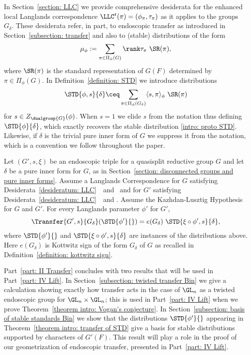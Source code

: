 \documentclass[11pt,letterpaper]{amsart}
\numberwithin{equation}{section}
\begin{document}
In Section~\ref{section: LLC} we provide comprehensive desiderata for the enhanced local Langlands correspondence $\LLC^\mathfrak{e}(\pi) = (\phi_\pi,\tau_\pi)$ as it applies to the groups $G_\delta$. 
{These desiderata refer, in part, to endoscopic transfer as introduced in Section~\ref{subsection: transfer} and also to (stable) distributions of the form
\begin{equation}\label{intro: proto STD}
\mu_{\phi}:=\sum_{\pi\in \Pi_\phi(G)} 
\rank \tau_\pi \  
\SR(\pi) ,
\end{equation}
where $\SR(\pi)$ is the standard representation of $G(F)$ determined by $\pi \in \Pi_\phi(G)$. 
}
In Definition~\ref{definition: STD} we introduce distributions 
\begin{equation}\label{intro: STD}
\STD{\phi,s}{\delta}
\ceq
\sum_{\pi\in \Pi_\phi(G_\delta)} 
\langle
s,\pi
\rangle_\phi \ 
\SR(\pi)
\end{equation}
for $s\in Z_{\dualgroup{G}}(\phi)$.
When $s=1$ we elide $s$ from the notation thus defining $\STD{\phi}{\delta}$, which exactly recovers
the stable distribution \eqref{intro: proto STD}. 
Likewise, if $\delta$ is the trivial pure inner form of $G$ we suppress it from the notation, which is a convention we follow throughout the paper.


\begin{theorem}
\label{theorem intro: transfer of STD}
Let $(G',s,\xi)$ be an endoscopic triple for a quasisplit reductive group $G$ and let $\delta$ be a pure inner form for $G$, as in Section~\ref{section: disconnected groups and pure inner forms}. 
Assume a Langlands Correspondence for $G$ satisfying Desiderata~\ref{desideratum: LLC}\ \LC \ and \ECR\  and for $G'$ satisfying Desiderata~\ref{desideratum: LLC}\ \LC \  and \Sta.
Assume the Kazhdan-Lusztig Hypothesis for $G$ and $G'$.
For every Langlands parameter $\phi'$ for $G'$,
\[
\Transfer{G',s}{G_\delta}
(\STD{\phi'}{})
=
e(G_\delta)\ 
\STD{\xi\circ\phi',s}{\delta},
\]
where $\STD{\phi'}{}$ and $\STD{\xi\circ\phi',s}{\delta}$ are instances of the 
distributions above. 
Here $e(G_\delta)$ is Kottwitz sign of the form $G_\delta$ of $G$ as recalled in Definition~\ref{definition: kottwitz sign}.
\end{theorem}

Part~\ref{part: II Transfer} concludes with two results that will be used in Part~\ref{part: IV Lift}.
In Section~\ref{subsection: twisted transfer Bin} we give a calculation showing exactly how transfer acts in the case of $\GL_n$ as a twisted endoscopic group for $\GL_n\times\GL_n$;
this is used in Part~\ref{part: IV Lift} when we prove Theorem~\ref{theorem intro: Vogan's conjecture}.
In Section~\ref{subsection: basis of stable standards Bin} we show that the distributions $\STD{\phi'}{}$ appearing in Theorem~\ref{theorem intro: transfer of STD} give a basis for stable distributions supported by characters of $G'(F)$.
This result will play a role in the proof of our geometrization of endoscopic transfer, presented in Part~\ref{part: IV Lift}.
\end{document}
